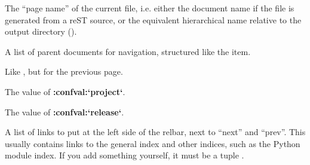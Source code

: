 \documentclass[letterpaper,10pt,english]{sphinxmanual}
\begin{document}

\begin{fulllineitems}
\label{templating:pagename}
The ``page name'' of the current file, i.e. either the document name if the
file is generated from a reST source, or the equivalent hierarchical name
relative to the output directory ().

\end{fulllineitems}


\begin{fulllineitems}
\label{templating:parents}
A list of parent documents for navigation, structured like the {\hyperref[templating:next]{}}
item.

\end{fulllineitems}


\begin{fulllineitems}
\label{templating:prev}
Like {\hyperref[templating:next]{}}, but for the previous page.

\end{fulllineitems}


\begin{fulllineitems}
\label{templating:project}
The value of {\color{red}\bfseries{}:confval:{}`project{}`}.

\end{fulllineitems}


\begin{fulllineitems}
\label{templating:release}
The value of {\color{red}\bfseries{}:confval:{}`release{}`}.

\end{fulllineitems}


\begin{fulllineitems}
\label{templating:rellinks}
A list of links to put at the left side of the relbar, next to ``next'' and
``prev''.  This usually contains links to the general index and other indices,
such as the Python module index.  If you add something yourself, it must be a
tuple .

\end{fulllineitems}
\end{document}
